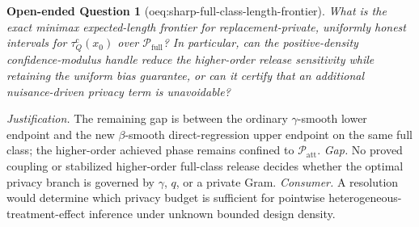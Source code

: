 \documentclass{article}
\newtheorem{openendedquestion}{Open-ended Question}
\begin{document}
\begin{openendedquestion}[oeq:sharp-full-class-length-frontier]\label{oeq:sharp-full-class-length-frontier}
What is the exact minimax expected-length frontier for replacement-private, uniformly honest intervals for \(\tau_Q^{\mathrm c}(x_0)\) over \(\mathcal P_{\mathrm{full}}\)? In particular, can the positive-density confidence-modulus handle reduce the higher-order release sensitivity while retaining the uniform bias guarantee, or can it certify that an additional nuisance-driven privacy term is unavoidable?
\end{openendedquestion}
\par\smallskip\noindent \textit{Justification.} The remaining gap is between the ordinary \(\gamma\)-smooth lower endpoint and the new \(\beta\)-smooth direct-regression upper endpoint on the same full class; the higher-order achieved phase remains confined to \(\mathcal P_{\mathrm{att}}\). \textit{Gap.} No proved coupling or stabilized higher-order full-class release decides whether the optimal privacy branch is governed by \(\gamma\), \(q\), or a private Gram. \textit{Consumer.} A resolution would determine which privacy budget is sufficient for pointwise heterogeneous-treatment-effect inference under unknown bounded design density.
\end{document}
